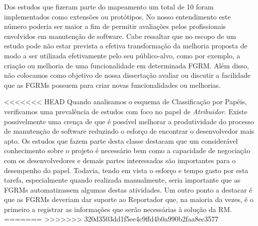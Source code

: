 Dos estudos que fizeram parte do mapeamento um total de 10 foram implementados
como extensões ou protótipos. No nosso entendimento este número poderia ser
maior a fim de permitir avaliações pelos profissionais envolvidos em manutenção
de software. Cabe ressaltar que no escopo de um estudo pode não estar prevista a
efetiva transformação da melhoria proposta de modo a ser utilizada efetivamente
pelo seu público-alvo, como por exemplo, a criação ou melhoria de uma
funcionalidade em determinada FGRM\@. Além disso, não colocamos como objetivo de
nossa dissertação avaliar ou discutir a facilidade que as FGRMs possuem para
criar novas funcionalidades ou melhorias.


<<<<<<< HEAD
Quando analisamos o esquema de Classificação por Papéis, verificamos uma
prevalência de estudos com foco no papel de \textit{Atribuidor}. Existe
possivelmente uma crença de que é possível melhorar a produtividade do processo
de manutenção de software reduzindo o esforço de encontrar o desenvolvedor mais
apto. Os estudos que fazem parte desta classe destacam que um considerável
conhecimento sobre o projeto é necessário bem como a capacidade de negociação
com os desenvolvedores e demais partes interessadas são importantes para o
desempenho do papel. Todavia, tendo em vista o esforço e tempo gasto por esta
tarefa, especialmente quando realizada ma\-nu\-al\-men\-te, seria importante que
as FGRMs automatizassem algumas destas atividades. Um outro ponto a destacar é
que as FGRMs deveriam dar suporte ao Reportador que, na maioria da vezes, é o
primeiro a registrar as informações que serão necessárias à solução da RM\@.
=======
>>>>>>> 320d3503dd1f5ee4c9ffd4b0a990b2faa8ec3577

